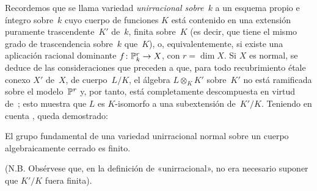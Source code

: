 Recordemos que se llama variedad \emph{unirracional sobre~$k$}
%
a un esquema propio e íntegro sobre~$k$ cuyo cuerpo de funciones $K$
está contenido en una extensión puramente trascendente~$K'$ de~$k$,
finita sobre~$K$ (es decir, que tiene el mismo grado de trascendencia
sobre~$k$ que~$K$), o, equivalentemente, si existe una aplicación racional
dominante $f\colon\mathbb P_k^r\to X$, con $r=\dim X$. Si $X$ es normal,
se deduce de las consideraciones que preceden a  que, para todo
recubrimiento étale conexo $X'$ de~$X$, de cuerpo~$L/K$, el álgebra
$L\otimes_K K'$ sobre~$K'$ no está ramificada sobre el modelo~$\mathbb P^r$ y,
por tanto, está completamente descompuesta en virtud de~; esto
muestra que $L$ es $K$-isomorfo a una subextensión de~$K'/K$. Teniendo en
cuenta , queda demostrado:

\begin{corollaire}
\label{XI.1.3}
El grupo fundamental de una variedad unirracional normal sobre un cuerpo
algebraicamente cerrado es finito.
\end{corollaire}

(N.B. Obsérvese que, en la definición de «unirracional», no era necesario
suponer que $K'/K$ fuera finita).

